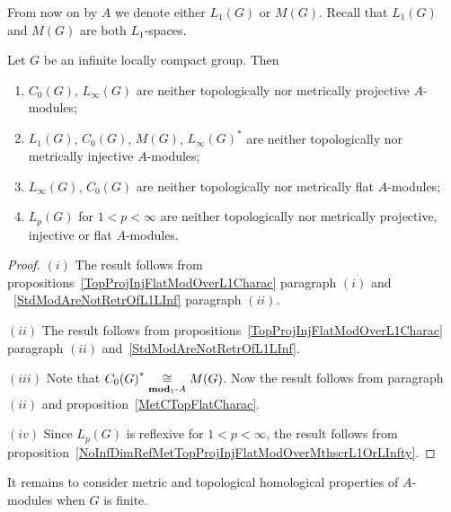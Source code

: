 From now on by $A$ we denote either $L_1(G)$ or $M(G)$. Recall that $L_1(G)$ and
$M(G)$ are both $L_1$-spaces.

\begin{proposition}\label{StdModAreNotL1MGMetTopProjInjFlat} Let $G$ be an
infinite locally compact group. Then

\begin{enumerate}[label = (\roman*)]
    \item $C_0(G)$, $L_\infty(G)$ are neither topologically nor metrically 
    projective $A$-modules;

    \item $L_1(G)$, $C_0(G)$, $M(G)$, ${L_\infty(G)}^*$ are neither 
    topologically nor metrically injective $A$-modules;

    \item $L_\infty(G)$, $C_0(G)$ are neither topologically nor metrically flat
    $A$-modules;

    \item $L_p(G)$ for $1<p<\infty$ are neither topologically nor metrically
    projective, injective or flat $A$-modules.
\end{enumerate}
\end{proposition}

\begin{proof} $(i)$ The result follows from
propositions~\ref{TopProjInjFlatModOverL1Charac} paragraph $(i)$ and
~\ref{StdModAreNotRetrOfL1LInf} paragraph $(ii)$.

$(ii)$ The result follows from propositions~\ref{TopProjInjFlatModOverL1Charac}
paragraph $(ii)$ and~\ref{StdModAreNotRetrOfL1LInf}.

$(iii)$ Note that ${C_0(G)}^*\mathrel{\mathop{\cong}\limits_{\mathbf{mod}_1\text{-}A}}M(G)$. Now the result 
follows from paragraph $(ii)$ and proposition~\ref{MetCTopFlatCharac}.

$(iv)$ Since $L_p(G)$ is reflexive for $1<p<\infty$, the result follows
from proposition~\ref{NoInfDimRefMetTopProjInjFlatModOverMthscrL1OrLInfty}.
\end{proof}

It remains to consider metric and topological homological properties of
$A$-modules when $G$ is finite.

